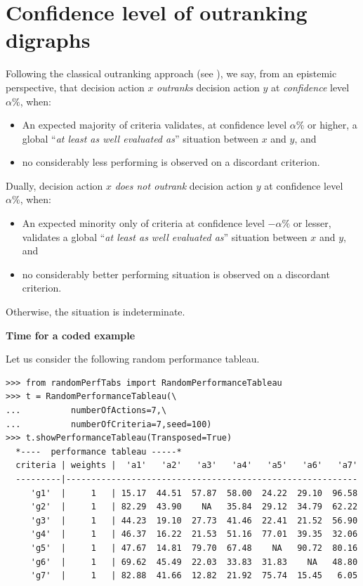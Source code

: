 \section{Confidence level of outranking digraphs}
\label{sec:18.3}

\begin{definition}\label{def:18.1}

\noindent Following the classical outranking approach (see \citep{BIS-2013}), we say, from an epistemic perspective, that decision action $x$ \emph{outranks} decision action $y$ at \emph{confidence} level $\alpha\%$, when:
\begin{itemize}[topsep=1pt]
\item An expected majority of criteria validates, at confidence level $\alpha\%$ or higher, a global ``\emph{at least as well evaluated as}'' situation between $x$ and $y$, and
\item no considerably less performing is observed on a discordant criterion.
\end{itemize}
Dually, decision action $x$ \emph{does not outrank} decision action $y$ at confidence level $\alpha\%$, when:
\begin{itemize}[topsep=0pt]
\item An expected minority only of criteria at confidence level $-\alpha\%$ or lesser, validates a global ``\emph{at least as well evaluated as}'' situation between $x$ and $y$, and
\item no considerably better performing situation is observed on a discordant criterion.
\end{itemize}
Otherwise, the situation is indeterminate.
\end{definition}

\noindent \textbf{Time for a coded example}

\noindent Let us consider the following random performance tableau.
\begin{lstlisting}[basicstyle=\ttfamily\scriptsize]
>>> from randomPerfTabs import RandomPerformanceTableau
>>> t = RandomPerformanceTableau(\
...          numberOfActions=7,\
...          numberOfCriteria=7,seed=100)
>>> t.showPerformanceTableau(Transposed=True)
  *----  performance tableau -----*
  criteria | weights |  'a1'   'a2'   'a3'   'a4'   'a5'   'a6'   'a7'   
  ---------|----------------------------------------------------------
     'g1'  |     1   | 15.17  44.51  57.87  58.00  24.22  29.10  96.58  
     'g2'  |     1   | 82.29  43.90    NA   35.84  29.12  34.79  62.22  
     'g3'  |     1   | 44.23  19.10  27.73  41.46  22.41  21.52  56.90  
     'g4'  |     1   | 46.37  16.22  21.53  51.16  77.01  39.35  32.06  
     'g5'  |     1   | 47.67  14.81  79.70  67.48    NA   90.72  80.16  
     'g6'  |     1   | 69.62  45.49  22.03  33.83  31.83    NA   48.80  
     'g7'  |     1   | 82.88  41.66  12.82  21.92  75.74  15.45   6.05  
\end{lstlisting}

